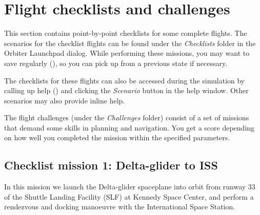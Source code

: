 \documentclass[Orbiter User Manual.tex]{subfiles}
\begin{document}
\section{Flight checklists and challenges}
\label{sec:checklists}
This section contains point-by-point checklists for some complete flights. The
scenarios for the checklist flights can be found under the \emph{Checklists}
folder in the Orbiter Launchpad dialog. While performing these missions, you may
want to save regularly (), so you can pick up from a previous
state if necessary.

The checklists for these flights can also be accessed during the simulation by
calling up help () and clicking the \emph{Scenario} button in
the help window. Other scenarios may also provide inline help.

The flight challenges (under the \emph{Challenges} folder) consist of a set of
missions that demand some skills in planning and navigation. You get a score
depending on how well you completed the mission within the specified parameters.


\subsection{Checklist mission 1: Delta-glider to ISS}
\label{ssec:checklist_1}
In this mission we launch the Delta-glider spaceplane into orbit from runway 33
of the Shuttle Landing Facility (SLF) at Kennedy Space Center, and perform a
rendezvous and docking manoeuvre with the International Space Station.
\end{document}
